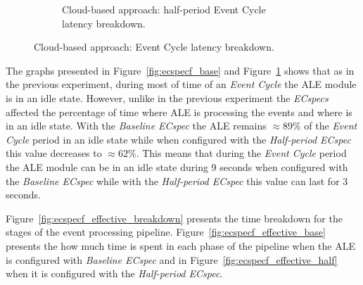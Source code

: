 \begin{figure}[ht!]
\begin{subfigure}{.5\textwidth}
    \caption{Cloud-based approach: half-period Event Cycle\\latency breakdown.}
    \label{fig:ecspecf_half}
  \end{subfigure}
  \caption{Cloud-based approach: Event Cycle latency breakdown.}
  \label{fig:ecspecf_breakdown}
\end{figure}

The graphs presented in Figure~\ref{fig:ecspecf_base} and Figure~\ref{fig:ecspecf_half} shows that
as in the previous experiment, during most of time of an \textit{Event Cycle} the \gls{ALE} module is
in an idle state. However, unlike in the previous experiment the \textit{ECspecs} affected the percentage of time
where \gls{ALE} is processing the events and where is in an idle state. With the \textit{Baseline ECspec}
the \gls{ALE} remains $\approx89\%$ of the \textit{Event Cycle} period in an idle state while when configured with
the \textit{Half-period ECspec} this value decreases to $\approx62\%$. This means that during the \textit{Event Cycle}
period the \gls{ALE} module can be in an idle state during 9 seconds when configured with the
\textit{Baseline ECspec} while with the \textit{Half-period ECspec} this value can last for 3 seconds.\\

\pagebreak

Figure~\ref{fig:ecspecf_effective_breakdown} presents the time breakdown for the stages of the
event processing pipeline. Figure~\ref{fig:ecspecf_effective_base} presents the how much time is spent
in each phase of the pipeline when the \gls{ALE} is configured with \textit{Baseline ECspec} and in
Figure~\ref{fig:ecspecf_effective_half} when it is configured with the \textit{Half-period ECspec}.\\

